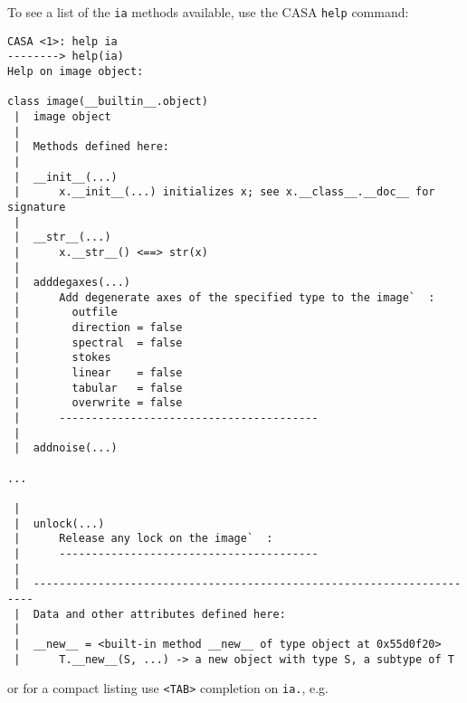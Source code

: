 To see a list of the {\tt ia} methods available, use the 
CASA {\tt help} command:
\small
\begin{verbatim}
CASA <1>: help ia 
--------> help(ia)
Help on image object:

class image(__builtin__.object)
 |  image object
 |  
 |  Methods defined here:
 |  
 |  __init__(...)
 |      x.__init__(...) initializes x; see x.__class__.__doc__ for signature
 |  
 |  __str__(...)
 |      x.__str__() <==> str(x)
 |  
 |  adddegaxes(...)
 |      Add degenerate axes of the specified type to the image`  : 
 |        outfile
 |        direction = false
 |        spectral  = false
 |        stokes
 |        linear    = false
 |        tabular   = false
 |        overwrite = false
 |      ----------------------------------------
 |  
 |  addnoise(...)

...

 |  
 |  unlock(...)
 |      Release any lock on the image`  : 
 |      ----------------------------------------
 |  
 |  ----------------------------------------------------------------------
 |  Data and other attributes defined here:
 |  
 |  __new__ = <built-in method __new__ of type object at 0x55d0f20>
 |      T.__new__(S, ...) -> a new object with type S, a subtype of T

\end{verbatim}
\normalsize
or for a compact listing use {\tt <TAB>} completion on {\tt ia.},
e.g.
\small

